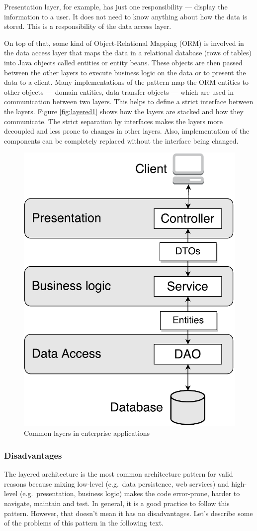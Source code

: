 \documentclass{book}
\begin{document}
Presentation layer, for example, has just one responsibility --- display
the information to a user. It does not need to know anything about how
the data is stored. This is a responsibility of the data access layer.

On top of that, some kind of Object-Relational Mapping (ORM) is involved
in the data access layer that maps the data in a relational database
(rows of tables) into Java objects called entities or entity beans.
These objects are then passed between the other layers to execute
business logic on the data or to present the data to a client. Many
implementations of the pattern map the ORM entities to other objects ---
domain entities, data transfer objects --- which are used in
communication between two layers. This helps to define a strict
interface between the layers. Figure \ref{fig:layered1} shows how the
layers are stacked and how they communicate. The strict separation by
interfaces makes the layers more decoupled and less prone to changes in
other layers. Also, implementation of the components can be completely
replaced without the interface being changed.


\begin{figure}[h!]
\begin{center}
\includegraphics[width=0.42\columnwidth]{figures/layered1/layered1}
\caption{Common layers in enterprise applications%
}
\end{center}
\end{figure}

\subsubsection{Disadvantages}\label{disadvantages}

The layered architecture is the most common architecture pattern for
valid reasons because mixing low-level (e.g.~data persistence, web
services) and high-level (e.g.~presentation, business logic) makes the
code error-prone, harder to navigate, maintain and test. In general, it
is a good practice to follow this pattern. However, that doesn't mean it
has no disadvantages. Let's describe some of the problems of this
pattern in the following text.
\end{document}

